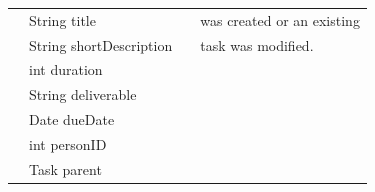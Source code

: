 \begin{tabular}{| l | l | l | l |}
		 	             & String title                     &                             & was created or an existing\\
                                                 & String shortDescription &                             & task was modified.\\
				 & int duration                   &                             & \\
				 & String deliverable          &                             &\\
		       		 & Date dueDate               &                             &\\
				 & int personID                  &                             &\\
				 & Task parent                   &                             &
\\
\hline
\end{tabular}

